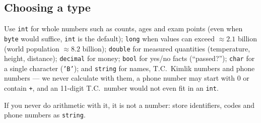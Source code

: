 \subsection{Choosing a type}
Use \texttt{int} for whole numbers such as counts, ages and exam points (even when \texttt{byte} would suffice, \texttt{int} is the default); \texttt{long} when values can exceed $\approx 2.1$ billion (world population $\approx 8.2$ billion); \texttt{double} for measured quantities (temperature, height, distance); \texttt{decimal} for money; \texttt{bool} for yes/no facts (``passed?''); \texttt{char} for a single character (\texttt{'B'}); and \texttt{string} for names, T.C.\ Kimlik numbers and phone numbers --- we never calculate with them, a phone number may start with 0 or contain \texttt{+}, and an 11-digit T.C.\ number would not even fit in an \texttt{int}.
\begin{notebox}
If you never do arithmetic with it, it is not a number: store identifiers, codes and phone numbers as \texttt{string}.
\end{notebox}

